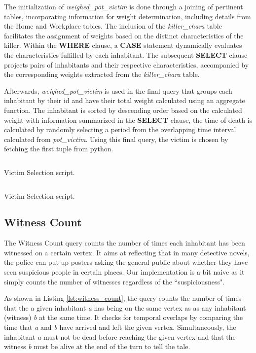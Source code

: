 \documentclass{article}
\begin{document}
The initialization of \textit{weighed\_pot\_victim} is done through a joining of pertinent tables, incorporating information for weight determination, including details from the Home and Workplace tables. The inclusion of the \textit{killer\_chara} table facilitates the assignment of weights based on the distinct characteristics of the killer. Within the \textbf{WHERE} clause, a \textbf{CASE} statement dynamically evaluates the characteristics fulfilled by each inhabitant. The subsequent \textbf{SELECT} clause projects pairs of inhabitants and their respective characteristics, accompanied by the corresponding weights extracted from the \textit{killer\_chara} table.

Afterwards, \textit{weighed\_pot\_victim} is used in the final query that groups each inhabitant by their id and have their total weight calculated using an aggregate function. The inhabitant is sorted by descending order based on the calculated weight with information summarized in the \textbf{SELECT} clause, the time of death is calculated by randomly selecting a period from the overlapping time interval calculated from \textit{pot\_victim}. Using this final query, the victim is chosen by fetching the first tuple from python.

\begin{listing}[H]
    \inputminted[firstline=3, lastline=36, breaklines=true]
    {sql}{kill_sequence.sql}
    \caption{Victim Selection script.}
    \label{lst:victim_selection}
\end{listing}

\begin{listing}[H]
    \ContinuedFloat
    \inputminted[firstline=37, breaklines=true]
    {sql}{kill_sequence.sql}
    \caption{Victim Selection script.}
    \label{lst:victim_selection}
\end{listing}

\subsection{Witness Count}

The Witness Count query counts the number of times each inhabitant has been witnessed on a certain vertex. It aims at reflecting that in many detective novels, the police can put up posters asking the general public about whether they have seen suspicious people in certain places. Our implementation is a bit naive as it simply counts the number of witnesses regardless of the ``suspiciousness".

As shown in Listing \ref{lst:witness_count}, the query counts the number of times that the a given inhabitant \textit{a} has being on the same vertex as as any inhabitant (witness) \textit{b} at the same time. It checks for temporal overlaps by comparing the time that \textit{a} and \textit{b} have arrived and left the given vertex. Simultaneously, the inhabitant \textit{a} must not be dead before reaching the given vertex and that the witness \textit{b} must be alive at the end of the turn to tell the tale.
\end{document}
